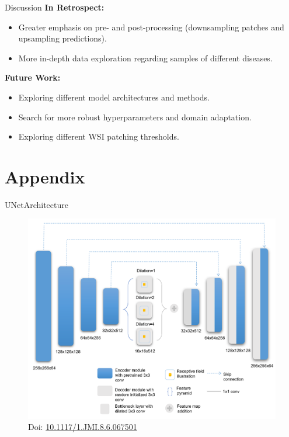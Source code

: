 \documentclass{beamer}
\begin{document}
\begin{frame}{Discussion}
    \textbf{In Retrospect:}
    \begin{itemize}
        \item Greater emphasis on pre- and post-processing (downsampling patches and upsampling predictions).
        \item More in-depth data exploration regarding samples of different diseases.
    \end{itemize}

    \vspace{0.5cm}

    \textbf{Future Work:}
    \begin{itemize}
        \item Exploring different model architectures and methods.
        \item Search for more robust hyperparameters and domain adaptation.
        \item Exploring different WSI patching thresholds.
    \end{itemize}
\end{frame}

\appendix

\section{Appendix}

\begin{frame}{UNetArchitecture}
    \begin{figure}
        \centering
        \includegraphics[height=0.7\textheight]{Images/UNetArchitecture.png}
        \caption{Doi: \href{https://doi.org/10.1117/1.JMI.8.6.067501}{10.1117/1.JMI.8.6.067501}}
    \end{figure}
\end{frame}
\end{document}
